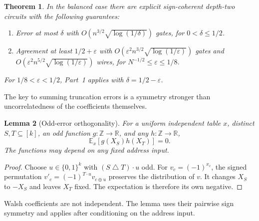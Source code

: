 \documentclass[11pt]{article}
\newtheorem{theorem}{Theorem}[section]
\newtheorem{lemma}[theorem]{Lemma}
\newcommand{\bits}{\{0,1\}}
\begin{document}
\begin{theorem}\label{thm:avgupper}
In the balanced case there are explicit sign-coherent depth-two circuits
with the following guarantees:
\begin{enumerate}
\item Error at most $\delta$ with
 $O(n^{3/2}\sqrt{\log(1/\delta)})$ gates, for $0<\delta\le1/2$.
\item Agreement at least $1/2+\varepsilon$ with
 $O(\varepsilon^2n^{3/2}\sqrt{\log(1/\varepsilon)})$ gates and
 $O(\varepsilon^2n^{5/2}\sqrt{\log(1/\varepsilon)})$ wires, for
 $N^{-1/2}\le\varepsilon\le1/8$.
\end{enumerate}
For $1/8<\varepsilon<1/2$, Part~1 applies with $\delta=1/2-\varepsilon$.
\end{theorem}

The key to summing truncation errors is a symmetry stronger than
uncorrelatedness of the coefficients themselves.
\begin{lemma}[Odd-error orthogonality]\label{lem:odd}
For a uniform independent table $x$, distinct $S,T\subseteq[k]$,
an odd function $g:\mathbb Z\to\mathbb R$, and any $h:\mathbb Z\to\mathbb R$,
$$\mathbb E_x[g(X_S)h(X_T)]=0.$$
The functions may depend on any fixed address input.
\end{lemma}
\begin{proof}
Choose $u\in\bits^k$ with $(S\mathbin\triangle T)\cdot u$ odd.
For $v_c=(-1)^{x_c}$, the signed permutation
$v'_c=(-1)^{T\cdot u}v_{c\oplus u}$ preserves the distribution of $v$.
It changes $X_S$ to $-X_S$ and leaves $X_T$ fixed. The expectation is
therefore its own negative.
\end{proof}
Walsh coefficients are not independent. The lemma uses their pairwise
sign symmetry and applies after conditioning on the address input.
\end{document}
